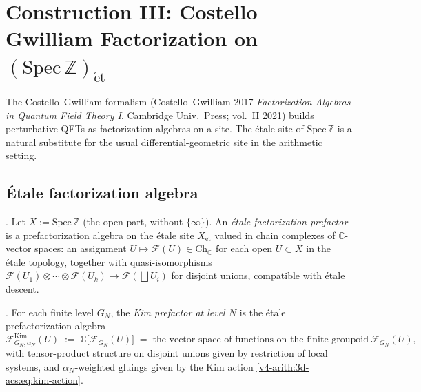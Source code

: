 \section{Construction III: Costello--Gwilliam Factorization on \texorpdfstring{\((\mathrm{Spec}\,\mathbb{Z})_{\mathrm{\acute et}}\)}{the etale site}}
\label{v4-arith:w10-a:construction-III}

The Costello--Gwilliam formalism
(Costello--Gwilliam 2017 \emph{Factorization Algebras in Quantum
Field Theory I}, Cambridge Univ.~Press; vol.~II 2021) builds
perturbative QFTs as factorization algebras on a site. The
\'etale site of \(\mathrm{Spec}\,\mathbb Z\) is a natural substitute
for the usual differential-geometric site in the arithmetic
setting.

\subsection{\'Etale factorization algebra}
\label{v4-arith:w10-a:CG-etale}

\begin{definition}
\label{v4-arith:w10-a:def:CG-prefactor}
\ClaimStatusDefinitional. Let \(X:=\mathrm{Spec}\,\mathbb{Z}\) (the
open part, without \(\{\infty\}\)). An \emph{\'etale factorization
prefactor} is a prefactorization algebra on the \'etale site
\(X_{\mathrm{\acute et}}\) valued in chain complexes of
\(\mathbb C\)-vector spaces: an assignment
\(U\mapsto\mathcal F(U)\in\mathrm{Ch}_{\mathbb C}\) for each open
\(U\subset X\) in the \'etale topology, together with
quasi-isomorphisms
\(\mathcal F(U_{1})\otimes\cdots\otimes\mathcal F(U_{k})\to\mathcal F(\bigsqcup U_{i})\)
for disjoint unions, compatible with \'etale descent.
\end{definition}

\begin{definition}
\label{v4-arith:w10-a:def:CG-Kim-prefactor}
\ClaimStatusDefinitional. For each finite level \(G_{N}\), the
\emph{Kim prefactor at level \(N\)} is the \'etale prefactorization
algebra
\[
\mathcal F^{\mathrm{Kim}}_{G_{N},\alpha_{N}}(U)
\;:=\;
\mathbb C\bigl[\mathcal F_{G_{N}}(U)\bigr]
\;=\;
\text{the vector space of functions on the finite groupoid}\ \mathcal F_{G_{N}}(U),
\]
with tensor-product structure on disjoint unions given by
restriction of local systems, and
\(\alpha_{N}\)-weighted gluings given by the Kim action
\eqref{v4-arith:3d-acs:eq:kim-action}.
\end{definition}

